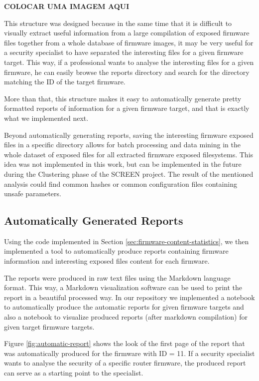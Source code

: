 \textbf{COLOCAR UMA IMAGEM AQUI}

This structure was designed because in the same time that it is difficult to visually extract useful information from a large compilation of exposed firmware files together from a whole database of firmware images, it may be very useful for a security specialist to have separated the interesting files for a given firmware target. This way, if a professional wants to analyse the interesting files for a given firmware, he can easily browse the reports directory and search for the directory matching the ID of the target firmware.

More than that, this structure makes it easy to automatically generate pretty formatted reports of information for a given firmware target, and that is exactly what we implemented next.

Beyond automatically generating reports, saving the interesting firmware exposed files in a specific directory allows for batch processing and data mining in the whole dataset of exposed files for all extracted firmware exposed filesystems. This idea was not implemented in this work, but can be implemented in the future during the Clustering phase of the SCREEN project. The result of the mentioned analysis could find common hashes or common configuration files containing unsafe parameters.

\subsection{Automatically Generated Reports}

Using the code implemented in Section \ref{sec:firmware-content-statistics}, we then implemented a tool to automatically produce reports containing firmware information and interesting exposed files content for each firmware.

The reports were produced in raw text files using the Markdown language format. This way, a Markdown visualization software can be used to print the report in a beautiful processed way. In our repository \cite{github:c2dc-toso} we implemented a notebook to automatically produce the automatic reports for given firmware targets and also a notebook to visualize produced reports (after markdown compilation) for given target firmware targets.

Figure \ref{fig:automatic-report} shows the look of the first page of the report that was automatically produced for the firmware with ID = 11. If a security specialist wants to analyse the security of a specific router firmware, the produced report can serve as a starting point to the specialist.

